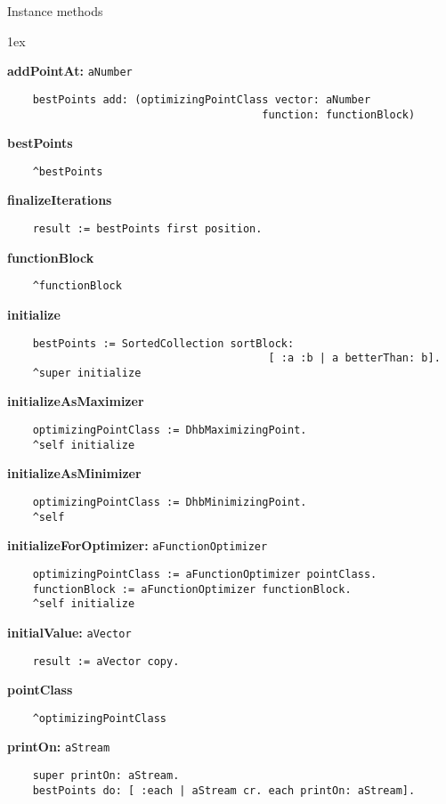 Instance methods
{\parskip 1ex\par\noindent}
{\bf addPointAt:} {\tt aNumber}
\begin{verbatim}
    bestPoints add: (optimizingPointClass vector: aNumber
                                        function: functionBlock)

\end{verbatim}
{\bf bestPoints}
\begin{verbatim}
    ^bestPoints

\end{verbatim}
{\bf finalizeIterations}
\begin{verbatim}
    result := bestPoints first position.

\end{verbatim}
{\bf functionBlock}
\begin{verbatim}
    ^functionBlock

\end{verbatim}
{\bf initialize}
\begin{verbatim}
    bestPoints := SortedCollection sortBlock:
                                         [ :a :b | a betterThan: b].
    ^super initialize

\end{verbatim}
{\bf initializeAsMaximizer}
\begin{verbatim}
    optimizingPointClass := DhbMaximizingPoint.
    ^self initialize

\end{verbatim}
{\bf initializeAsMinimizer}
\begin{verbatim}
    optimizingPointClass := DhbMinimizingPoint.
    ^self

\end{verbatim}
{\bf initializeForOptimizer:} {\tt aFunctionOptimizer}
\begin{verbatim}
    optimizingPointClass := aFunctionOptimizer pointClass.
    functionBlock := aFunctionOptimizer functionBlock.
    ^self initialize

\end{verbatim}
{\bf initialValue:} {\tt aVector}
\begin{verbatim}
    result := aVector copy.

\end{verbatim}
{\bf pointClass}
\begin{verbatim}
    ^optimizingPointClass

\end{verbatim}
{\bf printOn:} {\tt aStream}
\begin{verbatim}
    super printOn: aStream.
    bestPoints do: [ :each | aStream cr. each printOn: aStream].

\end{verbatim}
